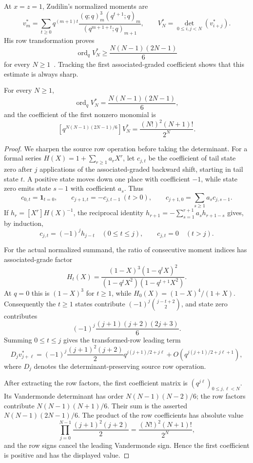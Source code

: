 \documentclass[11pt]{article}
\begin{document}
At $x=z=1$, Zudilin's normalized moments are
\[
 v_m^*=\sum_{t\ge0}q^{(m+1)t}
 \frac{(q;q)_m^3(q^{t+1};q)_m}{(q^{m+1+t};q)_{m+1}},
 \qquad
 V_N^*=\det_{0\le i,j<N}(v_{i+j}^*).
\]
His row transformation proves
\[
 \operatorname{ord}_q V_N^*\ge
 \frac{N(N-1)(2N-1)}6
\]
for every $N\ge1$~\cite[Section~4]{zudilin2016}.  Tracking the first
associated-graded coefficient shows that this estimate is always sharp.

\begin{theorem}
\label{res:zudilin-sharp-qorder}
For every $N\ge1$,
\[
 \operatorname{ord}_q V_N^*=\frac{N(N-1)(2N-1)}6,
\]
and the coefficient of the first nonzero monomial is
\[
 [q^{N(N-1)(2N-1)/6}]V_N^*
   =\frac{(N!)^2(N+1)!}{2^N}.
\]
\end{theorem}

\begin{proof}
We sharpen the source row operation before taking the determinant.  For a
formal series $H(X)=1+\sum_{r\ge1}a_rX^r$, let $c_{j,t}$ be the coefficient of
tail state zero after $j$ applications of the associated-graded backward
shift, starting in tail state $t$.  A positive state moves down one place with
coefficient $-1$, while state zero emits state $s-1$ with coefficient $a_s$.
Thus
\[
 c_{0,t}=\mathbf1_{t=0},\qquad
 c_{j+1,t}=-c_{j,t-1}\ (t>0),\qquad
 c_{j+1,0}=\sum_{s\ge1}a_sc_{j,s-1}.
\]
If $h_r=[X^r]H(X)^{-1}$, the reciprocal identity
$h_{r+1}=-\sum_{s=1}^{r+1}a_sh_{r+1-s}$ gives, by induction,
\[
 c_{j,t}=(-1)^jh_{j-t}\quad(0\le t\le j),
 \qquad c_{j,t}=0\quad(t>j).
\]

For the actual normalized summand, the ratio of consecutive moment indices
has associated-grade factor
\[
 H_t(X)=\frac{(1-X)^3(1-q^tX)^2}
 {(1-q^tX^2)(1-q^{t+1}X^2)}.
\]
At $q=0$ this is $(1-X)^3$ for $t\ge1$, while
$H_0(X)=(1-X)^4/(1+X)$.  Consequently the $t\ge1$ states contribute
$(-1)^j\binom{j-t+2}{2}$, and state zero contributes
\[
 (-1)^j\frac{(j+1)(j+2)(2j+3)}6.
\]
Summing $0\le t\le j$ gives the transformed-row leading term
\[
 D_jv_{j+\ell}^*
 =(-1)^j\frac{(j+1)^2(j+2)}2
   q^{j(j+1)/2+j\ell}
  +O\!\left(q^{j(j+1)/2+j\ell+1}\right),
\]
where $D_j$ denotes the determinant-preserving source row operation.

After extracting the row factors, the first coefficient matrix is
$(q^{j\ell})_{0\le j,\ell<N}$.  Its Vandermonde determinant has order
$N(N-1)(N-2)/6$; the row factors contribute
$N(N-1)(N+1)/6$.  Their sum is the asserted
$N(N-1)(2N-1)/6$.  The product of the row coefficients has absolute value
\[
 \prod_{j=0}^{N-1}\frac{(j+1)^2(j+2)}2
 =\frac{(N!)^2(N+1)!}{2^N},
\]
and the row signs cancel the leading Vandermonde sign.  Hence the first
coefficient is positive and has the displayed value.
\end{proof}
\end{document}
